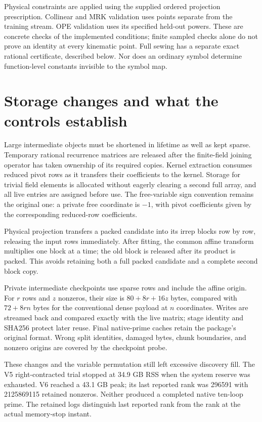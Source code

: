 \documentclass[11pt]{article}
\begin{document}
Physical constraints are applied using the supplied ordered projection
prescription. Collinear and MRK validation uses points separate from the
training stream. OPE validation uses its specified held-out powers. These
are concrete checks of the implemented conditions; finite sampled checks
alone do not prove an identity at every kinematic point. Full sewing has a
separate exact rational certificate, described below. Nor does an ordinary
symbol determine function-level constants invisible to the symbol map.

\section{Storage changes and what the controls establish}
Large intermediate objects must be shortened in lifetime as well as kept
sparse. Temporary rational recurrence matrices are released after the
finite-field joining operator has taken ownership of its required copies.
Kernel extraction consumes reduced pivot rows as it transfers their
coefficients to the kernel. Storage for trivial field elements is allocated
without eagerly clearing a second full array, and all live entries are
assigned before use. The free-variable sign convention remains the
original one: a private free coordinate is $-1$, with pivot coefficients
given by the corresponding reduced-row coefficients.

Physical projection transfers a packed candidate into its irrep blocks row
by row, releasing the input rows immediately. After fitting, the common
affine transform multiplies one block at a time; the old block is released
after its product is packed. This avoids retaining both a full packed
candidate and a complete second block copy.

Private intermediate checkpoints use sparse rows and include the affine
origin. For $r$ rows and $z$ nonzeros, their size is $80+8r+16z$ bytes,
compared with $72+8rn$ bytes for the conventional dense payload at $n$
coordinates. Writes are streamed back and compared exactly with the live
matrix; stage identity and SHA256 protect later reuse. Final native-prime
caches retain the package's original format. Wrong split identities,
damaged bytes, chunk boundaries, and nonzero origins are covered by the
checkpoint probe.

These changes and the variable permutation still left excessive discovery
fill. The V5 right-contracted trial stopped at 34.9 GB RSS when the system
reserve was exhausted. V6 reached a 43.1 GB peak; its last reported rank was
296591 with 2125869115 retained nonzeros. Neither produced a completed
native ten-loop prime. The retained logs distinguish last reported rank
from the rank at the actual memory-stop instant.
\end{document}
